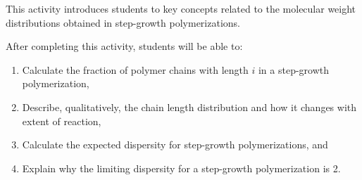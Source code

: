 %
%
%
%

\renewcommand{\figpath}{content/polymchem/stepgrowth/dispersity/figs}
\renewcommand{\labelbase}{step-dispersity}

\begin{activity}

\begin{instructornotes}

	This activity introduces students to key concepts related to the molecular weight distributions obtained in step-growth polymerizations.
	
	After completing this activity, students will be able to:
			\begin{enumerate}
				\item Calculate the fraction of polymer chains with length $i$ in a step-growth polymerization,
				\item Describe, qualitatively, the chain length distribution and how it changes with extent of reaction,
				\item Calculate the expected dispersity for step-growth polymerizations, and
				\item Explain why the limiting dispersity for a step-growth polymerization is 2.
			\end{enumerate}
			

\end{instructornotes}
\end{activity}

